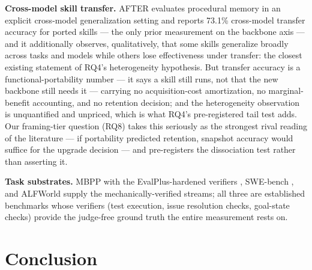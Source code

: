 \documentclass[11pt]{article}
\begin{document}
\textbf{Cross-model skill transfer.} AFTER \citep{AFTER2026} evaluates procedural memory in an explicit cross-model generalization setting and reports 73.1\% cross-model transfer accuracy for ported skills --- the only prior measurement on the backbone axis --- and it additionally observes, qualitatively, that some skills generalize broadly across tasks and models while others lose effectiveness under transfer: the closest existing statement of RQ4's heterogeneity hypothesis. But transfer accuracy is a functional-portability number --- it says a skill still runs, not that the new backbone still needs it --- carrying no acquisition-cost amortization, no marginal-benefit accounting, and no retention decision; and the heterogeneity observation is unquantified and unpriced, which is what RQ4's pre-registered tail test adds. Our framing-tier question (RQ8) takes this seriously as the strongest rival reading of the literature --- if portability predicted retention, snapshot accuracy would suffice for the upgrade decision --- and pre-registers the dissociation test rather than asserting it.

\textbf{Task substrates.} MBPP with the EvalPlus-hardened verifiers \citep{MBPP2021,EvalPlus2023}, SWE-bench \citep{SWEbench2024}, and ALFWorld \citep{ALFWorld2021} supply the mechanically-verified streams; all three are established benchmarks whose verifiers (test execution, issue resolution checks, goal-state checks) provide the judge-free ground truth the entire measurement rests on.

\section{Conclusion}
\end{document}
